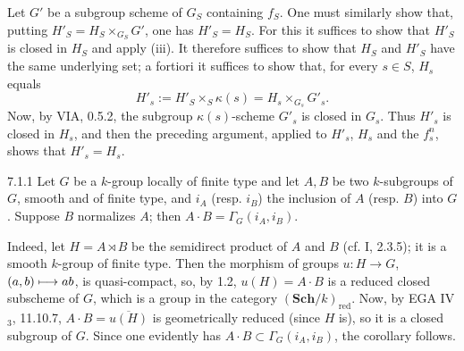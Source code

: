 Let $G'$ be a subgroup scheme of $G_S$ containing $f_S$. One must similarly show that, putting $H'_S=H_S\times_{G_S}G'$, one has $H'_S=H_S$. For this it suffices to show that $H'_S$ is closed in $H_S$ and apply (iii). It therefore suffices to show that $H_S$ and $H'_S$ have the same underlying set; a fortiori it suffices to show that, for every $s\in S$, $H_s$ equals
\[
H'_s:=H'_S\times_S\kappa(s)=H_s\times_{G_s}G'_s.
\]
Now, by VIA, 0.5.2, the subgroup $\kappa(s)$-scheme $G'_s$ is closed in $G_s$. Thus $H'_s$ is closed in $H_s$, and then the preceding argument, applied to $H'_s$, $H_s$ and the $f_s^n$, shows that $H'_s=H_s$.
\begin{corollary}{7.1.1}\label{VIB.7.1.1}
Let $G$ be a $k$-group locally of finite type and let $A,B$ be two $k$-subgroups of $G$, smooth and of finite type, and $i_A$ (resp. $i_B$) the inclusion of $A$ (resp. $B$) into $G$. Suppose $B$ normalizes $A$; then $A\cdot B=\Gamma_G(i_A,i_B)$.
\end{corollary}
Indeed, let $H=A\rtimes B$ be the semidirect product of $A$ and $B$ (cf. I, 2.3.5); it is a smooth $k$-group of finite type. Then the morphism of groups $u:H\to G$, $(a,b)\longmapsto ab$, is quasi-compact, so, by 1.2, $u(H)=A\cdot B$ is a reduced closed subscheme of $G$, which is a group in the category $(\mathbf{Sch}/k)_{\mathrm{red}}$. Now, by EGA IV$_3$, 11.10.7, $A\cdot B=\overline{u(H)}$ is geometrically reduced (since $H$ is), so it is a closed subgroup of $G$. Since one evidently has $A\cdot B\subset\Gamma_G(i_A,i_B)$, the corollary follows.
